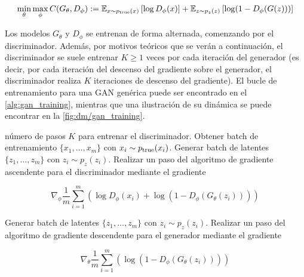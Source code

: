 \begin{equation}
    \label{eq:gan_objective}
	\min_\theta\max_\phi C(G_\theta, D_\phi) := \mathbb{E}_{x\sim p_{\operatorname{true}}(x)}\left[\log D_\phi(x)\right] + \mathbb{E}_{z\sim p_z(z)}\left[\log (1-D_\phi(G(z)))\right]
\end{equation}

Los modelos $G_\theta$ y $D_\phi$ se entrenan de forma alternada, comenzando por el discriminador. Además, por motivos teóricos que se verán a continuación, el discriminador se suele entrenar $K\geq 1$ veces por cada iteración del generador (es decir, por cada iteración del descenso del gradiente sobre el generador, el discriminador realiza $K$ iteraciones de descenso del gradiente). El bucle de entrenamiento para una GAN genérica puede ser encontrado en el \autoref{alg:gan_training}, mientras que una ilustración de su dinámica se puede encontrar en la \autoref{fig:dm/gan_training}.

\begin{algorithm}
	\caption{Entrenamiento de una GAN}
    \label{alg:gan_training}
	\begin{algorithmic}[1]
		\Require número de pasos $K$ para entrenar el discriminador.
		\State Obtener batch de entrenamiento $\{x_1,\ldots,x_m\}$ con $x_i\sim p_{\operatorname{true}}(x_i)$.
		\State Generar batch de latentes $\{z_1,\ldots,z_m\}$ con $z_i\sim p_z(z_i)$.
		\State Realizar un paso del algoritmo de gradiente ascendente para el discriminador mediante el gradiente

		\begin{equation*}
			\nabla_\phi \frac{1}{m}\sum_{i=1}^m \left(\log D_\phi(x_i) + \log(1-D_\phi(G_\theta(z_i)))\right)
		\end{equation*}

		\EndFor
		\State Generar batch de latentes $\{z_1,\ldots,z_m\}$ con $z_i\sim p_z(z_i)$.
		\State Realizar un paso del algoritmo de gradiente descendente para el generador mediante el gradiente

		\begin{equation*}
			\nabla_\theta \frac{1}{m}\sum_{i=1}^m \left( \log(1-D_\phi(G_\theta(z_i)))\right)
		\end{equation*}

		\EndWhile
	\end{algorithmic}
\end{algorithm}


